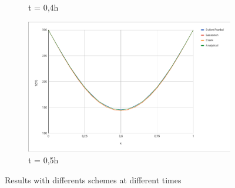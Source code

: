 \documentclass{article}
\begin{document}
\begin{figure}[H]
\begin{subfigure}[b]{0.45\textwidth}
                \caption{t = 0,4h}
            \end{subfigure}
            \begin{subfigure}[b]{0.45\textwidth}
                \includegraphics[width=\textwidth]{t05.png}
                \caption{t = 0,5h}
            \end{subfigure}
            \caption{Results with differents schemes at different times}
        \end{figure}
\end{document}

